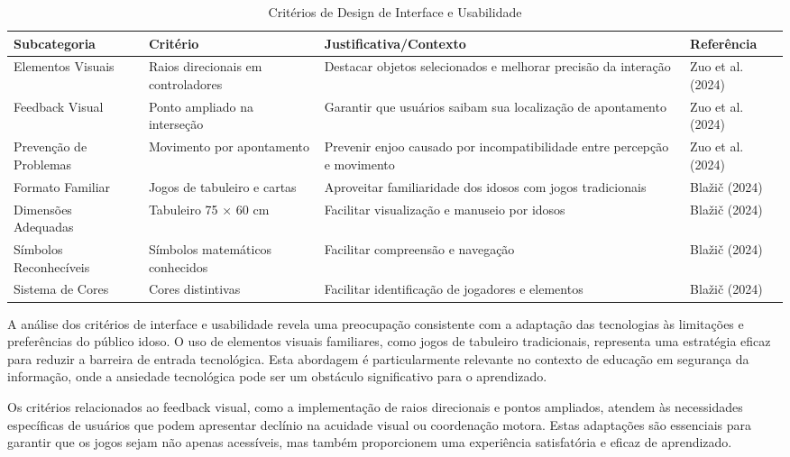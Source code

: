 \begin{table}[H]
\centering
\caption{Critérios de Design de Interface e Usabilidade}
\label{tab:interface_usabilidade}
\begin{tabular}{p{2.5cm}p{3cm}p{5cm}p{3cm}}
\hline
\textbf{Subcategoria} & \textbf{Critério} & \textbf{Justificativa/Contexto} & \textbf{Referência} \\ \hline
Elementos Visuais & Raios direcionais em controladores & Destacar objetos selecionados e melhorar precisão da interação & Zuo et al. (2024) \\
Feedback Visual & Ponto ampliado na interseção & Garantir que usuários saibam sua localização de apontamento & Zuo et al. (2024) \\
Prevenção de Problemas & Movimento por apontamento & Prevenir enjoo causado por incompatibilidade entre percepção e movimento & Zuo et al. (2024) \\
Formato Familiar & Jogos de tabuleiro e cartas & Aproveitar familiaridade dos idosos com jogos tradicionais & Blažič (2024) \\
Dimensões Adequadas & Tabuleiro 75 × 60 cm & Facilitar visualização e manuseio por idosos & Blažič (2024) \\
Símbolos Reconhecíveis & Símbolos matemáticos conhecidos & Facilitar compreensão e navegação & Blažič (2024) \\
Sistema de Cores & Cores distintivas & Facilitar identificação de jogadores e elementos & Blažič (2024) \\
\hline
\end{tabular}
\end{table}

A análise dos critérios de interface e usabilidade revela uma preocupação consistente com a adaptação das tecnologias às limitações e preferências do público idoso. O uso de elementos visuais familiares, como jogos de tabuleiro tradicionais, representa uma estratégia eficaz para reduzir a barreira de entrada tecnológica. Esta abordagem é particularmente relevante no contexto de educação em segurança da informação, onde a ansiedade tecnológica pode ser um obstáculo significativo para o aprendizado.

Os critérios relacionados ao feedback visual, como a implementação de raios direcionais e pontos ampliados, atendem às necessidades específicas de usuários que podem apresentar declínio na acuidade visual ou coordenação motora. Estas adaptações são essenciais para garantir que os jogos sejam não apenas acessíveis, mas também proporcionem uma experiência satisfatória e eficaz de aprendizado.

